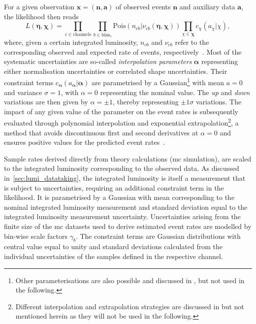 For a given observation $\boldsymbol{x} = (\boldsymbol{n},\boldsymbol{a})$ of observed events $\boldsymbol{n}$ and auxiliary data $\boldsymbol{a}$, the likelihood then reads
\begin{equation}
	L (\boldsymbol{\eta}, \boldsymbol{\chi}) = \prod_{c\in\mathrm{channels}} \prod_{b\in\mathrm{bins_c}} \mathrm{Pois}(n_{cb}\vert\nu_{cb}(\boldsymbol{\eta},\boldsymbol{\chi})) \prod_{\chi\in\boldsymbol{\chi}}c_\chi (a_\chi\vert\chi),
\end{equation}
where, given a certain integrated luminosity, $n_{cb}$ and $\nu_{cb}$ refer to the corresponding observed and expected rate of events, respectively~\cite{ATL-PHYS-PUB-2019-029}.
Most of the systematic uncertainties are so-called \textit{interpolation parameters} $\boldsymbol{\alpha}$ representing either normalisation uncertainties or correlated shape uncertainties.
Their constraint terms $c_{\boldsymbol{\alpha}}(a_{\boldsymbol{\alpha}}\vert\boldsymbol{\alpha})$ are parametrised by a Gaussian\footnote{Other parameterisations are also possible and discussed in \cite{Cranmer:1456844}, but not used in the following.} with mean $a = 0$ and variance $\sigma = 1$, with $\alpha = 0$ representing the nominal value.
The \textit{up} and \textit{down} variations are then given by $\alpha=\pm 1$, thereby representing $\pm 1\sigma$ variations.
The impact of any given value of the parameter on the event rates is subsequently evaluated through polynomial interpolation and exponential extrapolation\footnote{Different interpolation and extrapolation strategies are discussed in \cite{Cranmer:1456844} but not mentioned herein as they will not be used in the following.}, a method that avoids discontinuous first and second derivatives at $\alpha = 0$ and ensures positive values for the predicted event rates~\cite{Cranmer:1456844}.

Sample rates derived directly from theory calculations (\ie \gls{mc} simulation), are scaled to the integrated luminosity corresponding to the observed data.
As discussed in~\cref{sec:lumi_datataking}, the integrated luminosity is itself a measurement that is subject to uncertainties, requiring an additional constraint term in the likelihood.
It is parametrised by a Gaussian with mean corresponding to the nominal integrated luminosity measurement and standard deviation equal to the integrated luminosity measurement uncertainty.
Uncertainties arising from the finite size of the \gls{mc} datasets used to derive estimated event rates are modelled by bin-wise scale factors $\gamma_b$.
The constraint terms are Gaussian distributions with central value equal to unity and standard deviations calculated from the individual uncertainties of the samples defined in the respective channel.

